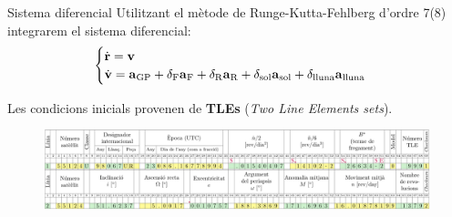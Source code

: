 \documentclass{beamer} %
\begin{document}
\begin{frame}{Sistema diferencial}
  Utilitzant el mètode de Runge-Kutta-Fehlberg d'ordre 7(8) integrarem el sistema diferencial:
  \begin{equation*}
    \begin{cases}
      \dot{\boldsymbol{\mathrm{r}}}=\boldsymbol{\mathrm{v}} \\
      \dot{\boldsymbol{\mathrm{v}}}=\boldsymbol{\mathrm{a}}_{\mathrm{GP}} + \delta_{\mathrm{F}}\boldsymbol{\mathrm{a}}_{\mathrm{F}}+\delta_{\mathrm{R}}\boldsymbol{\mathrm{a}}_{\mathrm{R}}+\delta_{\mathrm{sol}}\boldsymbol{\mathrm{a}}_{\mathrm{sol}}+\delta_{\mathrm{lluna}}\boldsymbol{\mathrm{a}}_\mathrm{lluna}
    \end{cases}
  \end{equation*}
  \pause
  \vspace{0.25cm}

  Les condicions inicials provenen de \textbf{TLEs} (\emph{Two Line Elements sets}).
  \begin{figure}
    \centering
    \includegraphics[width=\textwidth]{../Images/TLE_ca.pdf}
  \end{figure}
\end{frame}
\end{document}
